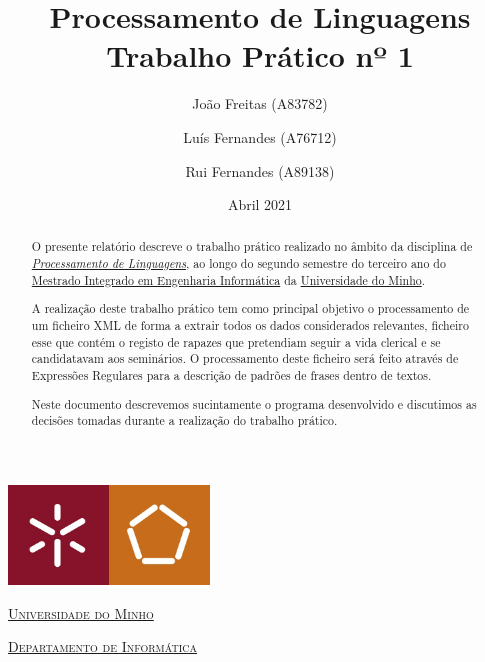 \documentclass[a4paper, 11pt]{article}
\title{Processamento de Linguagens \\  \Large Trabalho Prático nº 1}
\author{João Freitas (A83782) \and Luís Fernandes (A76712) \and Rui Fernandes (A89138)}
\date{Abril 2021}
\begin{document}
\begin{titlepage}
    \begin{center}
        \begin{minipage}{0.75\linewidth}
            \centering
            \includegraphics[width=0.4\textwidth]{img/um_eeng.jpg}\par\vspace{1cm}
            \vspace{1.5cm}
            \href{https://www.uminho.pt/PT}{\scshape\LARGE Universidade do Minho} \par
            \vspace{1cm}
            \href{https://www.di.uminho.pt/}{\scshape\Large Departamento de Informática} \par
            \vspace{1.5cm}
            \maketitle
        \end{minipage}
    \end{center}
    \vspace{2cm}
    \thispagestyle{empty}
    \clearpage
\end{titlepage}


\begin{abstract}  
O presente relatório descreve o trabalho prático realizado no âmbito da disciplina de
\href{https://miei.di.uminho.pt/plano_estudos.html#processamento_de_linguagens}
{\emph{Processamento de Linguagens}}, ao longo do segundo semestre do terceiro ano do
\href{http://miei.di.uminho.pt}{Mestrado Integrado em Engenharia Informática} da
\href{https://www.uminho.pt}{Universidade do Minho}.

A realização deste trabalho prático tem como principal objetivo o processamento de um ficheiro XML
de forma a extrair todos os dados considerados relevantes, ficheiro esse que contém o registo de
rapazes que pretendiam seguir a vida clerical e se candidatavam aos seminários. O processamento deste
ficheiro será feito através de Expressões Regulares para a descrição de padrões de frases dentro de
textos.

Neste documento descrevemos sucintamente o programa desenvolvido e discutimos as decisões tomadas
durante a realização do trabalho prático.
\end{abstract}
\end{document}
